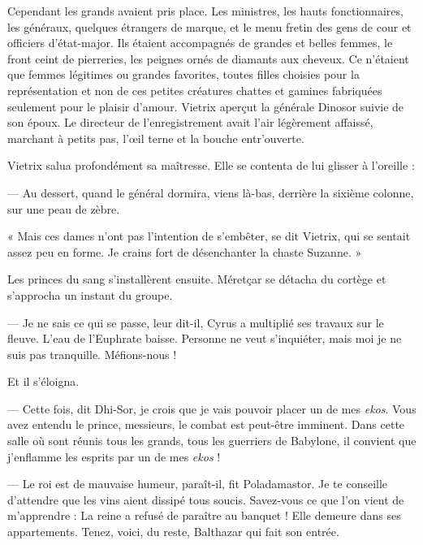 \documentclass[a4paper, 11pt, oneside, polutonikogreek, french]{article}
\begin{document}
\bigskip
\centerline{\EightStarTaper}
\centerline{\EightStarTaper\EightStarTaper}
\bigskip

Cependant les grands avaient pris place. Les ministres, les hauts fonctionnaires, les généraux, quelques étrangers de marque, et le menu fretin des gens de cour et officiers d'état-major. Ils étaient accompagnés de grandes et belles femmes, le front ceint de pierreries, les peignes ornés de diamants aux cheveux. Ce n'étaient que femmes légitimes ou grandes favorites, toutes filles choisies pour la représentation et non de ces petites créatures chattes et gamines fabriquées seulement pour le plaisir d'amour. Vietrix aperçut la générale Dinosor suivie de son époux. Le directeur de l'enregistrement avait l'air légèrement affaissé, marchant à petits pas, l'œil terne et la bouche entr'ouverte.

Vietrix salua profondément sa maîtresse. Elle se contenta de lui glisser à l'oreille :

--- Au dessert, quand le général dormira, viens là-bas, derrière la sixième colonne, sur une peau de zèbre.

« Mais ces dames n'ont pas l'intention de s'embêter, se dit Vietrix, qui se sentait assez peu en forme. Je crains fort de désenchanter la chaste Suzanne. »

Les princes du sang s'installèrent ensuite. Méretçar se détacha du cortège et s'approcha un instant du groupe.

--- Je ne sais ce qui se passe, leur dit-il, Cyrus a multiplié ses travaux sur le fleuve. L'eau de l'Euphrate baisse. Personne ne veut s'inquiéter, mais moi je ne suis pas tranquille. Méfions-nous !

Et il s'éloigna.

--- Cette fois, dit Dhi-Sor, je crois que je vais pouvoir placer un de mes \emph{ekos}. Vous avez entendu le prince, messieurs, le combat est peut-être imminent. Dans cette salle où sont réunis tous les grands, tous les guerriers de Babylone, il convient que j'enflamme les esprits par un de mes \emph{ekos} !

--- Le roi est de mauvaise humeur, paraît-il, fit Poladamastor. Je te conseille d'attendre que les vins aient dissipé tous soucis. Savez-vous ce que l'on vient de m'apprendre : La reine a refusé de paraître au banquet ! Elle demeure dans ses appartements. Tenez, voici, du reste, Balthazar qui fait son entrée.

\bigskip
\centerline{\EightStarTaper}
\centerline{\EightStarTaper\EightStarTaper}
\bigskip
\end{document}
